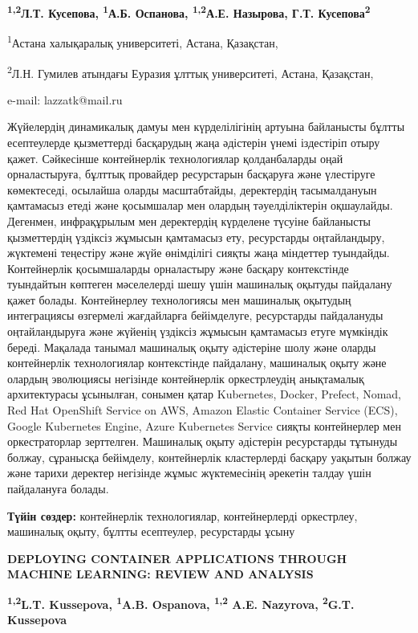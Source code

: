 \textbf{\textsuperscript{1,2}Л.Т. Кусепова, \textsuperscript{1}А.Б.
Оспанова, \textsuperscript{1,2}А.Е. Назырова, Г.Т.
Кусепова\textsuperscript{2}}

\textsuperscript{1}Астана халықаралық университеті, Астана, Қазақстан,

\textsuperscript{2}Л.Н. Гумилев атындағы Еуразия ұлттық университеті,
Астана, Қазақстан,

e-mail: lazzatk@mail.ru

Жүйелердің динамикалық дамуы мен күрделілігінің артуына байланысты
бұлтты есептеулерде қызметтерді басқарудың жаңа әдістерін үнемі
іздестіріп отыру қажет. Сәйкесінше контейнерлік технологиялар
қолданбаларды оңай орналастыруға, бұлттық провайдер ресурстарын
басқаруға және үлестіруге көмектеседі, осылайша оларды масштабтайды,
деректердің тасымалдануын қамтамасыз етеді және қосымшалар мен олардың
тәуелділіктерін оқшаулайды. Дегенмен, инфрақұрылым мен деректердің
күрделене түсуіне байланысты қызметтердің үздіксіз жұмысын қамтамасыз
ету, ресурстарды оңтайландыру, жүктемені теңестіру және жүйе өнімділігі
сияқты жаңа міндеттер туындайды. Контейнерлік қосымшаларды орналастыру
және басқару контекстінде туындайтын көптеген мәселелерді шешу үшін
машиналық оқытуды пайдалану қажет болады. Контейнерлеу технологиясы мен
машиналық оқытудың интеграциясы өзгермелі жағдайларға бейімделуге,
ресурстарды пайдалануды оңтайландыруға және жүйенің үздіксіз жұмысын
қамтамасыз етуге мүмкіндік береді. Мақалада танымал машиналық оқыту
әдістеріне шолу және оларды контейнерлік технологиялар контекстінде
пайдалану, машиналық оқыту және олардың эволюциясы негізінде
контейнерлік оркестрлеудің анықтамалық архитектурасы ұсынылған, сонымен
қатар Kubernetes, Docker, Prefect, Nomad, Red Hat OpenShift Service on
AWS, Amazon Elastic Container Service (ECS), Google Kubernetes Engine,
Azure Kubernetes Service сияқты контейнерлер мен оркестраторлар
зерттелген. Машиналық оқыту әдістерін ресурстарды тұтынуды болжау,
сұранысқа бейімделу, контейнерлік кластерлерді басқару уақытын болжау
және тарихи деректер негізінде жұмыс жүктемесінің әрекетін талдау үшін
пайдалануға болады.

\textbf{Түйін сөздер:} контейнерлік технологиялар, контейнерлерді
оркестрлеу, машиналық оқыту, бұлтты есептеулер, ресурстарды ұсыну

\textbf{DEPLOYING CONTAINER APPLICATIONS THROUGH MACHINE LEARNING:
REVIEW AND ANALYSIS}

\textbf{\textsuperscript{1,2}L.T. Kussepova, \textsuperscript{1}A.B.
Ospanova, \textsuperscript{1,2} A.E. Nazyrova, \textsuperscript{2}G.T.
Kussepova}

